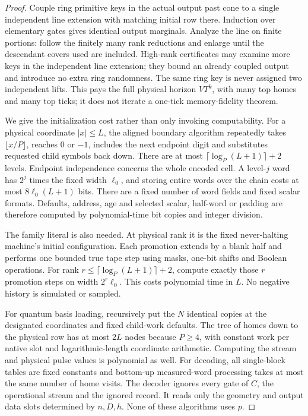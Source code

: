 \begin{proof}
Couple ring primitive keys in the actual output past cone to a single independent line extension with matching initial row there. Induction over elementary gates gives identical output marginals. Analyze the line on finite portions: follow the finitely many rank reductions and enlarge until the descendant covers used are included. High-rank certificates may examine more keys in the independent line extension; they bound an already coupled output and introduce no extra ring randomness. The same ring key is never assigned two independent lifts. This pays the full physical horizon $VT^k$, with many top homes and many top ticks; it does not iterate a one-tick memory-fidelity theorem.

We give the initialization cost rather than only invoking computability. For a physical coordinate $|x|\le L$, the aligned boundary algorithm repeatedly takes $\lfloor x/P\rfloor$, reaches $0$ or $-1$, includes the next endpoint digit and substitutes requested child symbols back down. There are at most $\lceil\log_P(L+1)\rceil+2$ levels. Endpoint independence concerns the whole encoded cell. A level-$j$ word has $2^j$ times the fixed width $\ell_0$, and storing entire words over the chain costs at most $8\ell_0(L+1)$ bits. There are a fixed number of word fields and fixed scalar formats. Defaults, address, age and selected scalar, half-word or padding are therefore computed by polynomial-time bit copies and integer division.

The family literal is also needed. At physical rank it is the fixed never-halting machine's initial configuration. Each promotion extends by a blank half and performs one bounded true tape step using masks, one-bit shifts and Boolean operations. For rank $r\le\lceil\log_P(L+1)\rceil+2$, compute exactly those $r$ promotion steps on width $2^r\ell_0$. This costs polynomial time in $L$. No negative history is simulated or sampled.

For quantum basis loading, recursively put the $N$ identical copies at the designated coordinates and fixed child-work defaults. The tree of homes down to the physical row has at most $2L$ nodes because $P\ge4$, with constant work per native slot and logarithmic-length coordinate arithmetic. Computing the stream and physical pulse values is polynomial as well. For decoding, all single-block tables are fixed constants and bottom-up measured-word processing takes at most the same number of home visits. The decoder ignores every gate of $C$, the operational stream and the ignored record. It reads only the geometry and output data slots determined by $n,D,h$. None of these algorithms uses $p$.


\end{proof}
